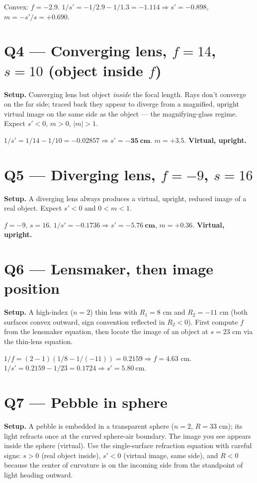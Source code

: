 \documentclass[11pt]{article}
\begin{document}
Convex: $f = -2.9$. $1/s' = -1/2.9 - 1/1.3 = -1.114 \Rightarrow s' = -0.898$, $m = -s'/s = \boxed{+0.690}$.

\section*{Q4 --- Converging lens, $f=14$, $s=10$ (object inside $f$)}
\textbf{Setup.} Converging lens but object \emph{inside} the focal length. Rays don't converge on the far side; traced back they appear to diverge from a magnified, upright virtual image on the same side as the object --- the magnifying-glass regime. Expect $s'<0$, $m>0$, $|m|>1$.

$1/s' = 1/14 - 1/10 = -0.02857 \Rightarrow s' = \mathbf{-35\ \text{cm}}$. $m = +3.5$. \textbf{Virtual, upright.}

\section*{Q5 --- Diverging lens, $f=-9$, $s=16$}
\textbf{Setup.} A diverging lens always produces a virtual, upright, reduced image of a real object. Expect $s'<0$ and $0<m<1$.

$f=-9$, $s=16$. $1/s' = -0.1736 \Rightarrow s' = \mathbf{-5.76\ \text{cm}}$, $m = \mathbf{+0.36}$. \textbf{Virtual, upright.}

\section*{Q6 --- Lensmaker, then image position}
\textbf{Setup.} A high-index ($n=2$) thin lens with $R_1=8$ cm and $R_2=-11$ cm (both surfaces convex outward, sign convention reflected in $R_2<0$). First compute $f$ from the lensmaker equation, then locate the image of an object at $s=23$ cm via the thin-lens equation.

$1/f = (2-1)(1/8 - 1/(-11)) = 0.2159 \Rightarrow f = 4.63$ cm.
$1/s' = 0.2159 - 1/23 = 0.1724 \Rightarrow s' = \boxed{5.80\ \text{cm}}$.

\section*{Q7 --- Pebble in sphere}
\textbf{Setup.} A pebble is embedded in a transparent sphere ($n=2$, $R=33$ cm); its light refracts once at the curved sphere-air boundary. The image you see appears inside the sphere (virtual). Use the single-surface refraction equation with careful signs: $s>0$ (real object inside), $s'<0$ (virtual image, same side), and $R<0$ because the center of curvature is on the incoming side from the standpoint of light heading outward.
\end{document}
